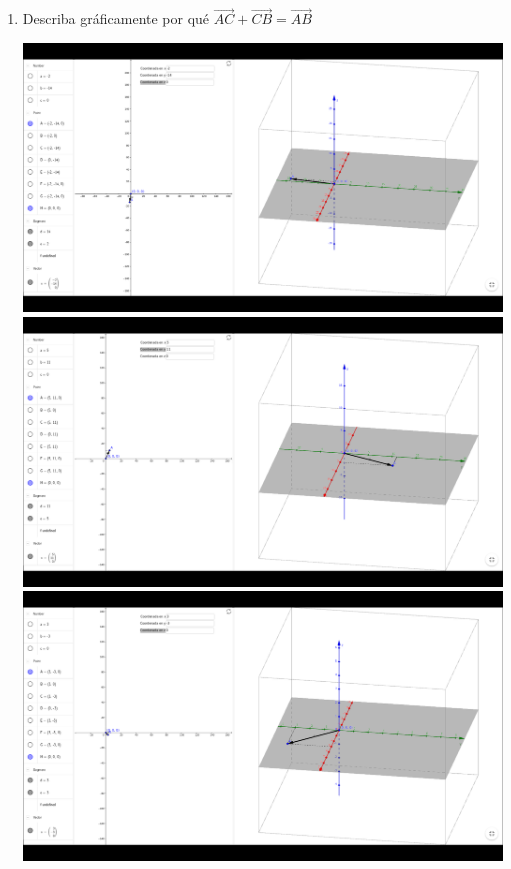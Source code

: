 \documentclass[10pt,letterpaper,fleqn]{article}
\begin{document}
\begin{enumerate}
\begin{enumerate}
          \item Describa gráficamente por qué $\overrightarrow{AC} +
          \overrightarrow{CB} = \overrightarrow{AB}$
          \begin{center}
              \includegraphics[scale=.3]{assets/img/Ejercicio13(c)1.png} \\
              \includegraphics[scale=.3]{assets/img/Ejercicio13(c)2.png} \\
              \includegraphics[scale=.3]{assets/img/Ejercicio13(c)3.png} \\
          \end{center}



\end{enumerate}
\end{enumerate}
\end{document}
